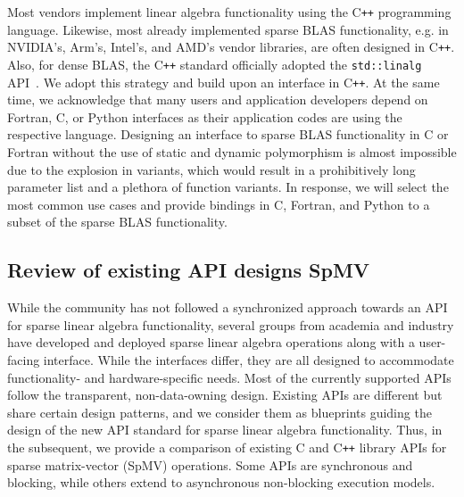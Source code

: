 \documentclass{article}
\newcommand{\cplusplus}{C\texttt{++}\xspace}
\begin{document}
Most vendors implement linear algebra functionality using the
\cplusplus programming language. Likewise, most already implemented
sparse BLAS functionality, e.g. in NVIDIA's, Arm's, Intel's, and AMD's
vendor libraries, are often designed in \cplusplus. Also, for dense
BLAS, the \cplusplus standard officially adopted the
\texttt{std::linalg} API~\cite{cpplinalg:p1673r13}. We adopt this
strategy and build upon an interface in \cplusplus. At the same time,
we acknowledge that many users and application developers depend on Fortran, C, or Python interfaces as their application codes are using the respective language. Designing an interface to sparse BLAS functionality in C or Fortran without the use of static and dynamic polymorphism is almost impossible due to the explosion in variants, which would result in a prohibitively long parameter list and a plethora of function variants. In response, we will select the most common use cases and provide bindings in C, Fortran, and Python to a subset of the sparse BLAS functionality.

\subsection{Review of existing API designs SpMV }
\label{sec:spmvReview}
While the community has not followed a synchronized approach towards an API for sparse linear algebra functionality, several groups from academia and industry have developed and deployed sparse linear algebra operations along with a user-facing interface. While the interfaces differ, they are all designed to accommodate functionality- and hardware-specific needs. Most of the currently supported APIs follow the transparent, non-data-owning design. 
Existing APIs are different but share certain design patterns, and we consider them as blueprints guiding the design of the new API standard for sparse linear algebra functionality.
Thus, in the subsequent, we provide a comparison of existing C and
\cplusplus library APIs for sparse matrix-vector (SpMV) operations.
Some APIs are synchronous and blocking, while others extend to asynchronous non-blocking execution models.
\end{document}
